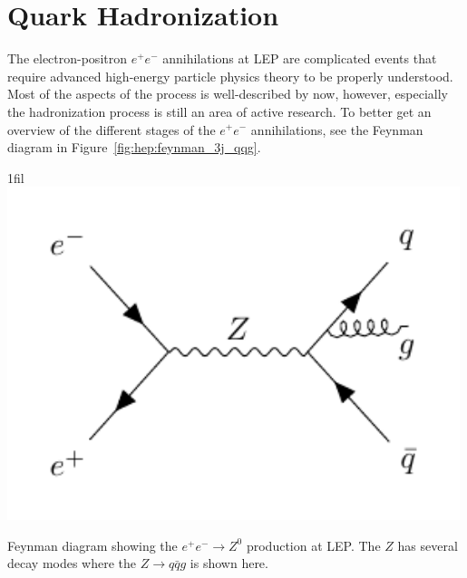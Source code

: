 \documentclass[a4paper, twoside, nobib]{tufte-book}
\makeatletter
\newcommand*{\centerfloat}{%
  \parindent \z@
  \leftskip \z@ \@plus 1fil \@minus \textwidth
  \rightskip\leftskip
  \parfillskip \z@skip}
\makeatother
\begin{document}
 

\FloatBarrier
\section{Quark Hadronization}
\label{sec:hep:quark_hadronization}

The electron-positron $e^+ e^-$ annihilations at LEP are complicated events that require advanced high-energy particle physics theory to be properly understood. Most of the aspects of the process is well-described by now, however, especially the hadronization process is still an area of active research. To better get an overview of the different stages of the $e^+e^-$ annihilations, see the Feynman diagram in Figure~\ref{fig:hep:feynman_3j_qqg}. 

\begin{marginfigure}
  \centerfloat
  \includegraphics[width=0.99\textwidth, trim=10 10 10 10, clip]{figures/feynman_diagrams/eeZqqg.pdf}
  \caption[Feynman diagram for the jet production at LEP]{Feynman diagram showing the $e^+ e^- \rightarrow Z^0$ production at LEP. The $Z$ has several decay modes where the $Z \rightarrow q\bar{q}g$ is shown here.}
  \label{fig:hep:feynman_3j_qqg}
\end{marginfigure}
\end{document}
